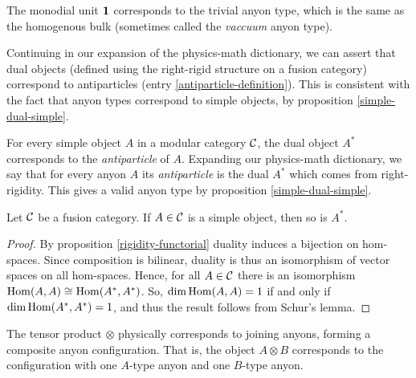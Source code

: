 \begin{dict}\label{vacuum-anyon-definition} The monodial unit ${\mathbf 1} $ corresponds to the trivial anyon type, which is the same as the homogenous bulk (sometimes called the  \textit{vaccuum} anyon type).
\end{dict}

\begin{rem} Continuing in our expansion of the physics-math dictionary, we can assert that dual objects (defined using the right-rigid structure on a fusion category) correspond to antiparticles (entry \ref{antiparticle-definition}). This is consistent with the fact that anyon types correspond to simple objects, by proposition \ref{simple-dual-simple}.
\end{rem}

\begin{dict}\label{antiparticle-definition}
For every simple object $A$ in a modular category ${\mathcal C}$, the dual object $A^*$ corresponds to the {\em antiparticle} of $A$.
Expanding our physics-math dictionary, we say that for every anyon $A$ its \textit{antiparticle} is the dual $A^*$ which comes from right-rigidity. This gives a valid anyon type by proposition \ref{simple-dual-simple}.
\end{dict}

\begin{prop}\label{simple-dual-simple} Let ${\mathcal C}$ be a fusion category. If $A\in {\mathcal C}$ is a simple object, then so is $A^*$.
\end{prop}
\begin{proof} By proposition \ref{rigidity-functorial} duality induces a bijection on hom-spaces. Since composition is bilinear, duality is thus an isomorphism of vector spaces on all hom-spaces. Hence, for all $A\in {\mathcal C}$ there is an isomorphism $\operatorname{Hom}(A,A)\cong \operatorname{Hom}(A^*,A^*)$.  So, $\dim \operatorname{Hom}(A,A)= 1$ if and only if $\dim \operatorname{Hom}(A^*,A^*)=1$, and thus the result follows from Schur's lemma.
\end{proof}

\begin{dict}\label{composite-system-def}
The tensor product $\otimes$ physically corresponds to joining anyons, forming a composite anyon configuration. That is, the object $A\otimes B$ corresponds to the configuration with one $A$-type anyon and one $B$-type anyon.
\end{dict}

